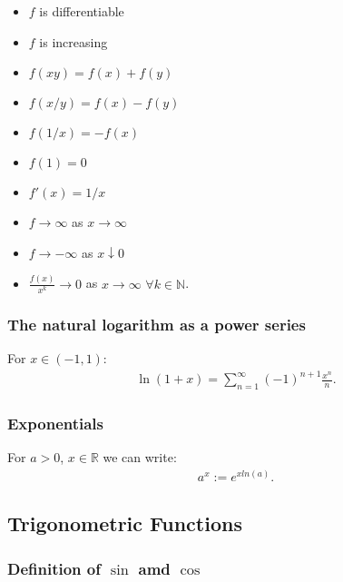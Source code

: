 \documentclass[a4paper, 12pt, twoside]{article}
\begin{document}
\begin{multicols}{2}
      \begin{itemize}
            \item $f$ is differentiable
            \item $f$ is increasing
            \item $f(xy) = f(x) + f(y)$
            \item $f(x / y) = f(x) - f(y)$
            \item $f(1/x) = -f(x)$
      \end{itemize}
      \columnbreak
      \begin{itemize}
            \item $f(1) = 0$
            \item $f'(x) = 1/x$
            \item $f \to \infty$ as $x \to \infty$
            \item $f \to -\infty$ as $x \downarrow 0$
            \item $\frac{f(x)}{x^k} \to 0$ as
                  $x \to \infty$ $\forall k \in \mathbb{N}$.
      \end{itemize}
\end{multicols}

\subsubsection{The natural logarithm as a power series}

For $x \in (-1, 1)$:
\begin{align*}
      \ln(1 + x) = \sum_{n = 1}^\infty(-1)^{n + 1} \frac{x^n}{n}.
\end{align*}

\subsubsection{Exponentials}

For $a > 0$, $x \in \mathbb{R}$ we can write:
\begin{align*}
      a^x := e^{xln(a)}.
\end{align*}

\subsection{Trigonometric Functions}

\subsubsection{Definition of $\sin$ amd $\cos$}
\end{document}
